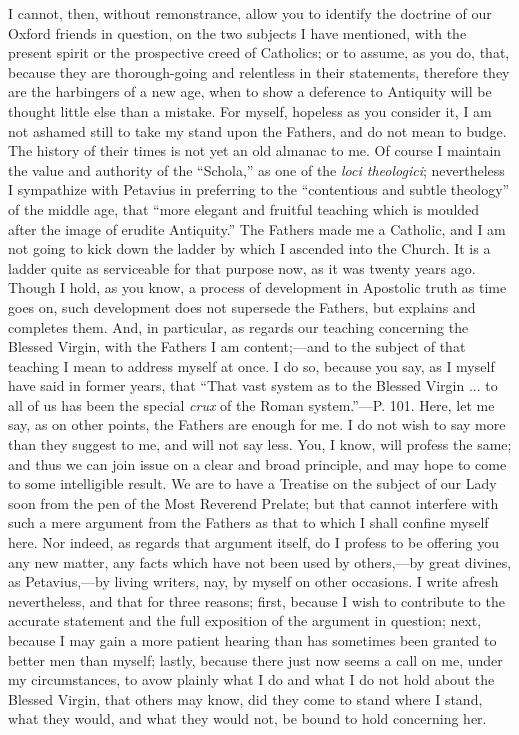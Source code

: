 I cannot, then, without remonstrance, allow you to identify the
doctrine of our Oxford friends in question, on the two subjects I have
mentioned, with the present spirit or the prospective creed of
Catholics; or to assume, as you do, that, because they are
thorough-going and relentless in their statements, therefore they are
the harbingers of a new age, when to show a deference to Antiquity will
be thought little else than a mistake. For myself, hopeless as you
consider it, I am not ashamed still to take my stand upon the Fathers,
and do not mean to budge. The history of their times is not yet an old
almanac to me. Of course I maintain the value and authority of the
``Schola,'' as one of the \emph{loci theologici}; nevertheless I
sympathize with Petavius in preferring to the ``contentious and
subtle theology'' of the middle age, that ``more elegant and
fruitful teaching which is moulded after the image of erudite
Antiquity.'' The Fathers made me a Catholic, and I am not going to
kick down the ladder by which I ascended into the Church. It is a ladder
quite as serviceable for that purpose now, as it was twenty years ago.
Though I hold, as you know, a process of development in Apostolic truth
as time goes on, such development does not supersede the Fathers, but
explains and completes them. And, in particular, as regards our teaching
concerning the Blessed Virgin, with the Fathers I am content;—and to
the subject of that teaching I mean to address myself at once. I do so,
because you say, as I myself have said in former years, that ``That
vast system as to the Blessed Virgin ... to all of us has been the
special \emph{crux} of the Roman system.''—P. 101. Here, let me
say, as on other points, the Fathers are enough for me. I do not
wish to say more than they suggest to me, and will not say less. You, I
know, will profess the same; and thus we can join issue on a clear and
broad principle, and may hope to come to some intelligible result. We
are to have a Treatise on the subject of our Lady soon from the pen of
the Most Reverend Prelate; but that cannot interfere with such a mere
argument from the Fathers as that to which I shall confine myself here.
Nor indeed, as regards that argument itself, do I profess to be offering
you any new matter, any facts which have not been used by others,—by
great divines, as Petavius,—by living writers, nay, by myself on other
occasions. I write afresh nevertheless, and that for three reasons;
first, because I wish to contribute to the accurate statement and the
full exposition of the argument in question; next, because I may gain a
more patient hearing than has sometimes been granted to better men than
myself; lastly, because there just now seems a call on me, under my
circumstances, to avow plainly what I do and what I do not hold about
the Blessed Virgin, that others may know, did they come to stand where I
stand, what they would, and what they would not, be bound to hold
concerning her.

